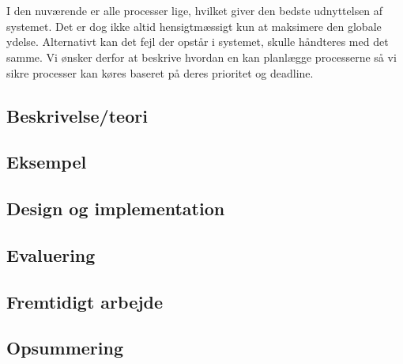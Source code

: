 \chapter{\ds}
I den nuværende \csp er alle processer lige, hvilket giver den bedste udnyttelsen af systemet. Det er dog ikke altid hensigtmæssigt kun at maksimere den globale ydelse. Alternativt kan det fejl der opstår i systemet, skulle  håndteres med det samme.   
Vi ønsker derfor at beskrive  hvordan \sched en kan planlægge processerne så vi sikre processer kan køres baseret på deres prioritet og deadline.
  \section{Beskrivelse/teori}
  \section{Eksempel}
  \section{Design og implementation}
  \section{Evaluering}
  \section{Fremtidigt arbejde}
  \section{Opsummering}
